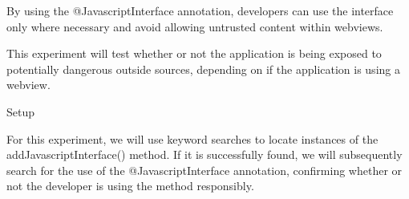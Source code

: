         By using the @JavascriptInterface annotation, developers can use the interface
        only where necessary and avoid allowing untrusted content within webviews.

        This experiment will test whether or not the application is being exposed to
        potentially dangerous outside sources, depending on if the application is
        using a webview.

        Setup

        For this experiment, we will use keyword searches to locate instances of 
        the addJavascriptInterface() method. If it is successfully found, we will 
        subsequently search for the use of the @JavascriptInterface annotation, confirming
        whether or not the developer is using the method responsibly.